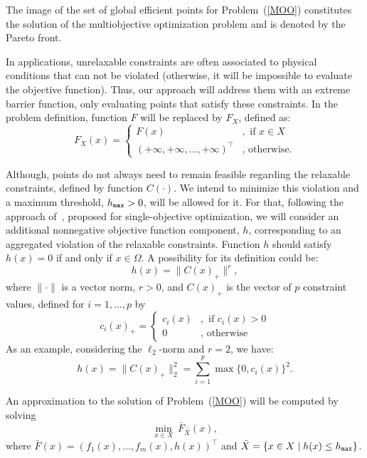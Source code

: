 \documentclass[12pt]{article}
\newcommand{\set}[1]{\{#1\}}
\newcommand{\eq}[1]{\left\{\begin{array}{ll} #1 \end{array}\right}
\begin{document}
The image of the set of global efficient points for
Problem~(\ref{MOO}) constitutes the solution of the multiobjective
optimization problem and is denoted by the Pareto front.

In applications, unrelaxable constraints are often associated to
physical conditions that can not be violated (otherwise, it will
be impossible to evaluate the objective function). Thus, our
approach will address them with an extreme barrier function, only
evaluating points that satisfy these constraints. In the problem
definition, function $F$ will be replaced by $F_X$, defined as:
\begin{equation}
F_X(x)= \eq{ F(x)&, \text{ if } x\in X\\
(+\infty,+\infty,\ldots,+\infty)^\top&, \text{ otherwise.}}.
\label{barrier_approach}
\end{equation}

Although, points do not always need to remain feasible regarding
the relaxable constraints, defined by function $C(\cdot)$. We
intend to minimize this violation and a maximum threshold, $h_{\tt
max}>0$, will be allowed for it. For that, following the approach
of~\cite{audet2004}, proposed for single-objective optimization,
we will consider an additional nonnegative objective function
component, $h$, corresponding to an aggregated violation of the
relaxable constraints. Function $h$ should satisfy $h(x)=0$ if and
only if $x\in\Omega$. A possibility for its definition could be:
\begin{equation}
\label{constraintv_function} h(x)=\|C(x)_+\|^r,
\end{equation}
where $\|\cdot\|$ is a vector norm, $r>0$, and $C(x)_+$ is the
vector of $p$ constraint values, defined for $i=1,\ldots,p$ by
\begin{equation}
c_i(x)_+=\eq{  c_i(x) &, \text{ if } c_i(x)>0\\
0 &, \text{ otherwise }}.
\end{equation}
As an example, considering the $\ell_2$-norm and $r=2$, we have:
\begin{equation*}
h(x)=\|C(x)_+\|_2^2=\displaystyle\sum_{i=1}^{p}\max\set{0,c_i(x)}^2.
\end{equation*}

An approximation to the solution of Problem~(\ref{MOO}) will be
computed by solving
\begin{equation}
\min_{x\in X}\  \bar{F}_{\bar{X}} (x),\label{MOO2}
\end{equation}
where $\bar{F}(x)=(f_{1}(x),\ldots ,f_{m}(x),h(x))^\top$ and
$\bar{X}=\{x\in X \mid h(x)\leq h_{\tt max}\}$.
\end{document}
